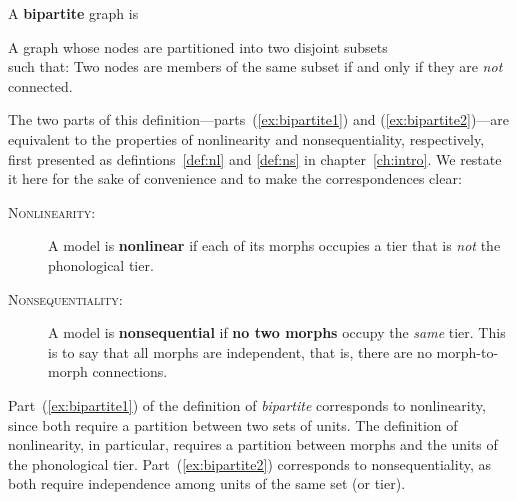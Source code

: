 \begin{exe} 
	\ex \label{ex:bipartite} A \textbf{bipartite} graph is 
	\begin{xlist} 
		\ex \label{ex:bipartite1} %
	 	A graph whose nodes are partitioned into two disjoint subsets \\ such that: %
		\ex \label{ex:bipartite2} %
		Two nodes are members of the same subset if and only if 
		they are \emph{not} connected.
	\end{xlist}
\end{exe}
The two parts of this definition---parts~(\ref{ex:bipartite1}) and (\ref{ex:bipartite2})---are equivalent to the properties of nonlinearity and 
nonsequentiality, respectively, first presented as defintions~\ref{def:nl} and \ref{def:ns} in chapter~\ref{ch:intro}. We restate it here for the sake of convenience and to make the correspondences clear:
	\begin{description}
	\item[\textsc{Nonlinearity:}]
	A model is \textbf{nonlinear} if each of its morphs occupies a tier that is \emph{not} the phonological tier.
	\item[\textsc{Nonsequentiality:}]
	A model is \textbf{nonsequential} if \textbf{no two morphs} occupy the \emph{same} tier. This is to say that all morphs are independent, that is, there are no morph-to-morph connections.
	\end{description}
Part~(\ref{ex:bipartite1}) of the definition of \emph{bipartite} corresponds to nonlinearity, since both require a partition between two sets of units. The definition of nonlinearity, in particular, requires a partition between morphs and the units of the phonological tier. 
Part~(\ref{ex:bipartite2}) corresponds to nonsequentiality, as both require independence among units of the same set (or tier).

